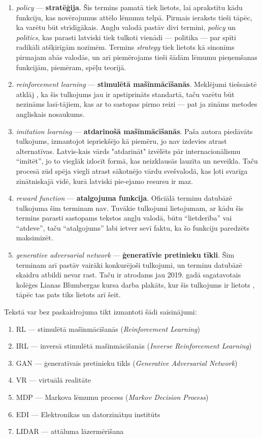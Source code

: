 \documentclass[12pt, a4paper]{article}
\numberwithin{equation}{section} %
\begin{document}
\begin{enumerate}
    \item \textit{policy} --- \textbf{stratēģija}. Šis termins pamatā tiek lietots, lai aprakstītu kādu funkciju, kas novērojumus attēlo lēmumu telpā. Pirmais ieraksts tieši tāpēc, ka varētu būt strīdīgākais. Angļu valodā pastāv divi termini, \textit{policy} un \textit{politics}, kas parasti latviski tiek tulkoti vienādi --- politika --- par spīti radikāli atšķirīgām nozīmēm. Termins \textit{strategy} tiek lietots kā sinonīms pirmajam abās valodās, un arī piemērojams tieši šādām lēmumu pieņemšanas funkcijām, piemēram, spēļu teorijā.
    \item \textit{reinforcement learning} --- \textbf{stimulētā mašīnmācīšanās}. Meklējumi tiešsaistē atklāj \cite{enc_stim}, ka šis tulkojums jau ir apstiprināts standartā, taču varētu būt nezināms lasī-tājiem, kas ar to sastopas pirmo reizi --- pat ja zināms metodes angliskais nosaukums.
    \item \textit{imitation learning} --- \textbf{atdarinošā mašīnmācīšanās}. Paša autora piedāvāts tulkojums, izmantojot iepriekšējo kā piemēru, jo nav izdevies atrast alternatīvas. Latvis-kais vārds "atdarināt" izvēlēts pār internacionālismu ``imitēt'', jo to vieglāk izlocīt formā, kas neizklausās lauzīta un neveikla. Taču procesā zūd spēja viegli atrast sākotnējo vārdu svešvalodā, kas ļoti svarīga zinātniskajā vidē, kurā latviski pie-ejamo resursu ir maz.
    \item \textit{reward function} --- \textbf{atalgojuma funkcija}. Oficiālā terminu datubāzē tulkojuma šim terminam nav. Tuvākie tulkojumi lietojumam, ar kādu šis termins parasti sastopams tekstos angļu valodā, būtu ``lietderība'' vai ``atdeve'', taču ``atalgojums'' labi ietver sevī faktu, ka šo funkciju paredzēts maksimizēt.
    \item \textit{generative adversarial network} --- \textbf{ģeneratīvie pretinieku tīkli}. Šim terminam arī pastāv vairāki konkurējoši tulkojumi, un terminu datubāzē skaidru atbildi nevar rast. Taču ir atrodams jau 2019. gadā sagatavotais kolēģes Lianas Blumbergas kursa darba plakāts, kur šis tulkojums ir lietots \cite{GAN}, tāpēc tas pats tiks lietots arī šeit.
\end{enumerate}

Tekstā var bez paskaidrojuma tikt izmantoti šādi saīsinājumi:

\begin{enumerate}
    \item RL --- stimulētā mašīnmācīšanās (\textit{Reinforcement Learning})
    \item IRL --- inversā stimulētā mašīnmācīšanās (\textit{Inverse Reinforcement Learning})
    \item GAN --- ģeneratīvais pretinieku tīkls (\textit{Generative Adversarial Network})
    \item VR --- virtuālā realitāte
    \item MDP --- Markova lēmumu process (\textit{Markov Decision Process})
    \item EDI --- Elektronikas un datorzinātņu institūts
    \item LIDAR --- attāluma lāzermērīšana
\end{enumerate}
\end{document}
